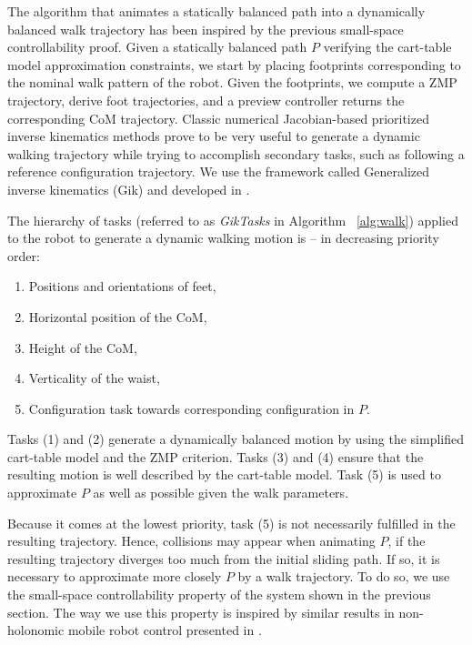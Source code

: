 The algorithm that animates a statically balanced path into a
dynamically balanced walk trajectory has been inspired by the previous
small-space controllability proof. Given a statically balanced path
$P$ verifying the cart-table model approximation constraints, we start
by placing footprints corresponding to the nominal walk pattern of the
robot. Given the footprints, we compute a ZMP trajectory, derive foot
trajectories, and a preview controller returns the corresponding CoM
trajectory. Classic numerical Jacobian-based prioritized inverse
kinematics methods prove to be very useful to generate a dynamic
walking trajectory while trying to accomplish secondary tasks, such as
following a reference configuration trajectory. We use the framework
called Generalized inverse kinematics (Gik) and developed in
\cite{yoshida2006tds}.

The hierarchy of tasks (referred to as \textit{GikTasks} in Algorithm
~\ref{alg:walk}) applied to the robot to generate a dynamic walking
motion is -- in decreasing priority order:

\begin{enumerate}

\item Positions and orientations of  feet,

\item Horizontal position of the CoM,

\item Height of the CoM,

\item Verticality of the waist,

\item Configuration task towards corresponding
  configuration  in $P$.

\end{enumerate}

Tasks (1) and (2) generate a dynamically balanced motion by using the
simplified cart-table model and the ZMP criterion. Tasks (3) and (4)
ensure that the resulting motion is well described by the cart-table
model. Task (5) is used to approximate $P$ as well as possible given
the walk parameters.

Because it comes at the  lowest priority, task (5) is not necessarily
fulfilled in  the resulting trajectory. Hence,  collisions may appear
when animating $P$, if the resulting trajectory diverges too much from
the initial sliding  path. If so, it is  necessary to approximate more
closely $P$  by a walk  trajectory.  To do  so, we use  the small-space
controllability  property   of  the  system  shown   in  the  previous
section. The way  we use this property is  inspired by similar results
in non-holonomic mobile robot control presented in \cite{taix-94}.

